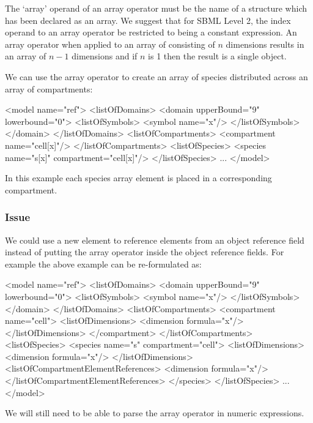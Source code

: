 \documentclass{cekarticle}
\begin{document}
The `array' operand of an array operator must be the name of a
structure which has been declared as an array.
We suggest that for SBML Level 2, the index operand to an array operator be
restricted to being a constant expression.  An array operator
when applied to an array of consisting of $n$ dimensions results
in an array of $n-1$ dimensions and if $n$ is 1 then the result
is a single object.

We can use the array operator to create an array of species
distributed across an array of compartments:
\begin{example}
<model name="ref">
    <listOfDomains>
        <domain upperBound="9" lowerbound="0">
            <listOfSymbols>
                <symbol name="x"/>
            </listOfSymbols>
        </domain>
    </listOfDomains>
    <listOfCompartments>
        <compartment name="cell[x]"/>
    </listOfCompartments>
    <listOfSpecies>
        <species name="s[x]" compartment="cell[x]"/>
    </listOfSpecies>
    ...
</model>
\end{example}
In this example each species array element is placed in a
corresponding compartment.

\subsubsection{Issue}
We could use a new element to reference elements from an object
reference field instead of putting the array operator inside the
object reference fields. For example the above example can be
re-formulated as:
\begin{example}
<model name="ref">
    <listOfDomains>
        <domain upperBound="9" lowerbound="0">
            <listOfSymbols>
                <symbol name="x"/>
            </listOfSymbols>
        </domain>
    </listOfDomains>
    <listOfCompartments>
        <compartment name="cell">
            <listOfDimensions>
                <dimension formula="x"/>
            </listOfDimensions>
        </compartment>
    </listOfCompartments>
    <listOfSpecies>
        <species name="s" compartment="cell">
            <listOfDimensions>
                <dimension formula="x"/>
            </listOfDimensions>
            <listOfCompartmentElementReferences>
                <dimension formula="x"/>
            </listOfCompartmentElementReferences>
        </species>
    </listOfSpecies>
    ...
</model>

\end{example}
We will still need to be able to parse the array operator in
numeric expressions.
\end{document}
